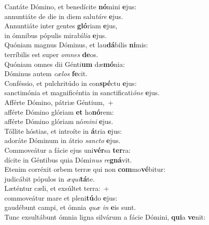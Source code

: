 \evenverse Cantáte Dómino, et benedícite \textbf{nó}mini \textbf{e}jus:~\*\\
\evenverse annuntiáte de die in diem salu\textit{tá}\textit{re} \textbf{e}jus.\\
\oddverse Annuntiáte inter gentes \textbf{gló}riam \textbf{e}jus,~\*\\
\oddverse in ómnibus pópulis mirabí\textit{li}\textit{a} \textbf{e}jus.\\
\evenverse Quóniam magnus Dóminus, et lau\textbf{dá}bilis \textbf{ni}mis:~\*\\
\evenverse terríbilis est super \textit{om}\textit{nes} \textbf{de}os.\\
\oddverse Quóniam omnes dii Génti\textbf{um} dæ\textbf{mó}nia:~\*\\
\oddverse Dóminus autem \textit{cæ}\textit{los} \textbf{fe}cit.\\
\evenverse Conféssio, et pulchritúdo in con\textbf{spé}ctu \textbf{e}jus:~\*\\
\evenverse sanctimónia et magnificéntia in sanctificati\textit{ó}\textit{ne} \textbf{e}jus.\\
\oddverse Afférte Dómino, pátriæ Géntium,~+\\
\oddverse  afférte Dómino glóriam \textbf{et} ho\textbf{nó}rem:~\*\\
\oddverse afférte Dómino glóriam nó\textit{mi}\textit{ni} \textbf{e}jus.\\
\evenverse Tóllite hóstias, et introíte in \textbf{á}tria \textbf{e}jus:~\*\\
\evenverse adoráte Dóminum in átrio \textit{san}\textit{cto} \textbf{e}jus.\\
\oddverse Commoveátur a fácie ejus uni\textbf{vér}sa \textbf{ter}ra:~\*\\
\oddverse dícite in Géntibus quia Dómi\textit{nus} \textit{re}\textbf{gná}vit.\\
\evenverse Etenim corréxit orbem terræ qui non \textbf{com}mo\textbf{vé}bitur:~\*\\
\evenverse judicábit pópulos in \textit{æ}\textit{qui}\textbf{tá}te.\\
\oddverse Læténtur cæli, et exsúltet terra:~+\\
\oddverse  commoveátur mare et pleni\textbf{tú}do \textbf{e}jus:~\*\\
\oddverse gaudébunt campi, et ómnia \textit{quæ} \textit{in} \textbf{e}is sunt.\\
\evenverse Tunc exsultábunt ómnia ligna silvárum a fácie Dómini, \textbf{qui}a \textbf{ve}nit:~\*\\

